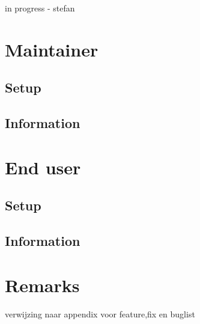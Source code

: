 
\begin{tcolorbox}[colback=green!30]
  in progress - stefan
\end{tcolorbox}

\section{Maintainer}
\subsection{Setup}
\subsection{Information}


\section{End user}
\subsection{Setup}
\subsection{Information}

\section{Remarks}

\begin{tcolorbox}[colback=yellow!30]
 verwijzing naar appendix voor feature,fix en buglist
\end{tcolorbox}




